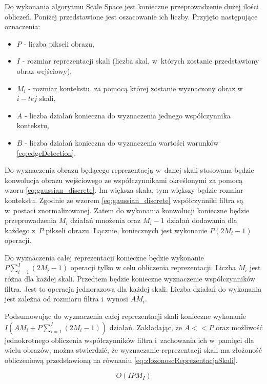 Do wykonania algorytmu Scale Space jest konieczne przeprowadzenie dużej ilości obliczeń. Poniżej przedstawione jest oszacowanie ich liczby. Przyjęto następujące oznaczenia:
\begin{itemize}
\item $ P $ - liczba pikseli obrazu,
\item $ I $ - rozmiar reprezentacji skali (liczba skal, w~których zostanie przedstawiony obraz wejściowy),
\item $ M_i $ - rozmiar kontekstu, za pomocą której zostanie wyznaczony obraz w $ i-tej $ skali,
\item $ A $ - liczba działań konieczna do wyznaczenia jednego współczynnika kontekstu,
\item $ B $ - liczba działań konieczna do wyznaczenia wartości warunków \eqref{eq:edgeDetection}.
\end{itemize}

Do wyznaczenia obrazu będącego reprezentacją w~danej skali stosowana będzie konwolucja obrazu wejściowego ze współczynnikami określonymi za pomocą wzoru \eqref{eq:gaussian_discrete}. Im większa skala, tym większy będzie rozmiar kontekstu. Zgodnie ze wzorem \eqref{eq:gaussian_discrete} współczynniki filtra są w~postaci znormalizowanej. Zatem do wykonania konwolucji konieczne będzie przeprowadzenia $ M_i $ działań mnożenia oraz $ M_i - 1 $ działań dodawania dla każdego z~$P$ pikseli obrazu. Łącznie, koniecznych jest wykonanie $ P  (2M_i - 1) $ operacji.

Do wyznaczenia całej reprezentacji konieczne będzie wykonanie 
$ P  \sum_{i=1}^I(2 M_i - 1) $ operacji tylko w celu obliczenia reprezentacji. Liczba $ M_i $ jest różna dla każdej skali. Przedtem będzie konieczne wyznaczenie współczynników filtra. Jest to operacja jednorazowa dla każdej skali. Liczba działań do wykonania jest zależna od rozmiaru filtra i~wynosi $ A  M_i $.

Podsumowując do wyznaczenia całej reprezentacji skali konieczne wykonanie $ I  (A  M_i + P  \sum_{i=1}^I(2 M_i - 1)) $ działań. Zakładając, że $ A << P $ oraz możliwość jednokrotnego obliczenia współczynników filtra i~zachowania ich w~pamięci dla wielu obrazów, można stwierdzić, że wyznaczanie reprezentacji skali ma złożoność obliczeniową przedstawioną na równaniu \eqref{eq:zlozonoscReprezentacjaSkali}. 

\begin{equation}
\label{eq:zlozonoscReprezentacjaSkali}
O(I  P  M_I)
\end{equation}

